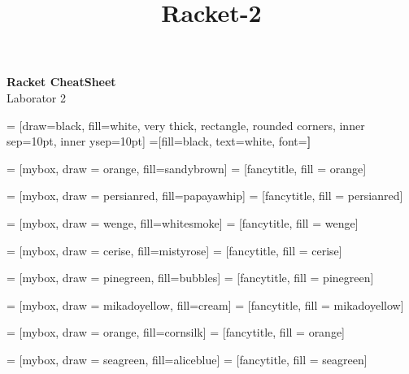 \documentclass[a4paper]{article}
\title{Racket-2}
\begin{document}
\begin{center}{\huge{\textbf{Racket CheatSheet}}}\\
{\large Laborator 2}
\end{center}
\begin{multicols*}{3}

 = [draw=black, fill=white, very thick,
    rectangle, rounded corners, inner sep=10pt, inner ysep=10pt]
 =[fill=black, text=white, font=\bfseries]

 = [mybox, draw = orange, fill=sandybrown]
 = [fancytitle, fill = orange]


 = [mybox, draw = persianred, fill=papayawhip]
 = [fancytitle, fill = persianred]

 = [mybox, draw = wenge, fill=whitesmoke]
 = [fancytitle, fill = wenge]

 = [mybox, draw = cerise, fill=mistyrose]
 = [fancytitle, fill = cerise]

 = [mybox, draw = pinegreen, fill=bubbles]
 = [fancytitle, fill = pinegreen]

 = [mybox, draw = mikadoyellow, fill=cream]
 = [fancytitle, fill = mikadoyellow]

 = [mybox, draw = orange, fill=cornsilk]
 = [fancytitle, fill = orange]

 = [mybox, draw = seagreen, fill=aliceblue]
 = [fancytitle, fill = seagreen]


\end{multicols*}
\end{document}
